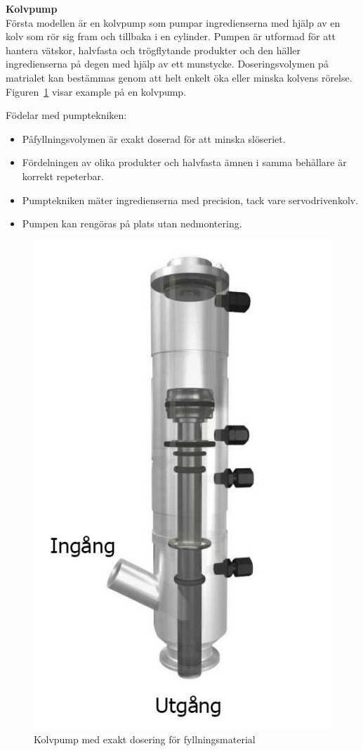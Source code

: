 \textbf{Kolvpump}\\
Första modellen är en kolvpump som pumpar ingredienserna med hjälp av en kolv som rör sig fram och tillbaka i en cylinder. Pumpen är utformad för att hantera vätskor, halvfasta och trögflytande produkter och den häller ingredienserna på degen med hjälp av ett munstycke. Doseringsvolymen på matrialet kan bestämmas genom att helt enkelt öka eller minska kolvens rörelse. Figuren~\ref{kolvpump} visar example på en kolvpump.

Födelar med pumptekniken:
\begin{itemize}
	\item Påfyllningsvolymen är exakt doserad för att minska slöseriet.
	\item Fördelningen av olika produkter och halvfasta ämnen i samma behållare är korrekt repeterbar.
	\item Pumptekniken mäter ingredienserna med precision, tack vare servodrivenkolv.
	\item Pumpen kan rengöras på plats utan nedmontering.
\end{itemize}

\begin{figure}[h]
	\begin{center}
		\includegraphics[scale=0.5]{images/maxresdefault.jpg}
		\caption{Kolvpump med exakt dosering för fyllningsmaterial~\cite{Dosering pump}}
		\label{kolvpump}	
	\end{center}
\end{figure}

